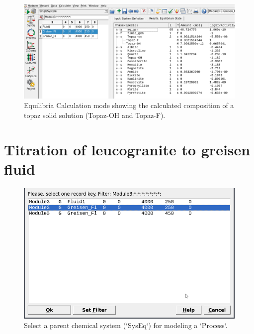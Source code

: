\documentclass[
]{book}
\begin{document}
\begin{figure}
\includegraphics[width=1\linewidth]{figures/module3/fig-13} \caption{Equilibria Calculation mode showing the calculated composition of a topaz solid solution (Topaz-OH and Topaz-F).}\label{fig:fig-13c}
\end{figure}

\hypertarget{titration-of-leucogranite-to-greisen-fluid}{%
\section{Titration of leucogranite to greisen fluid}\label{titration-of-leucogranite-to-greisen-fluid}}

\begin{figure}
\includegraphics[width=0.7\linewidth]{figures/module3/fig-14} \caption{Select a parent chemical system (`SysEq`) for modeling a `Process`.}\label{fig:fig-14c}
\end{figure}
\end{document}
